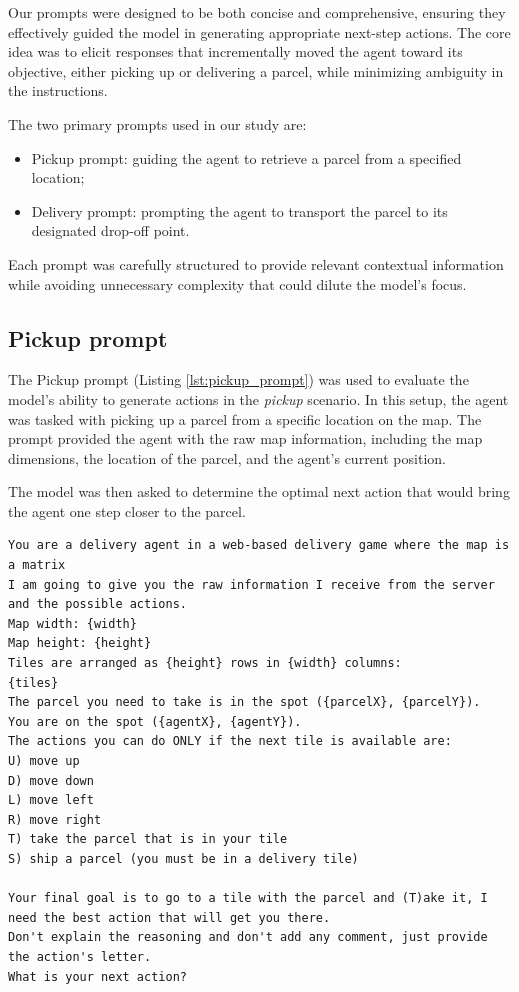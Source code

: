 Our prompts were designed to be both concise and comprehensive, ensuring they effectively
guided the model in generating appropriate next-step actions. The core idea was
to elicit responses that incrementally moved the agent toward its objective, either
picking up or delivering a parcel, while minimizing ambiguity in the
instructions.

The two primary prompts used in our study are:
\begin{itemize}
  \item Pickup prompt: guiding the agent to retrieve a parcel from a specified
    location;

  \item Delivery prompt: prompting the agent to transport the parcel to its
    designated drop-off point.
\end{itemize}

Each prompt was carefully structured to provide relevant contextual information
while avoiding unnecessary complexity that could dilute the model's focus.

\subsection{Pickup prompt}

The Pickup prompt (Listing \ref{lst:pickup_prompt}) was used to evaluate the model's
ability to generate actions in the \emph{pickup} scenario. In this setup, the
agent was tasked with picking up a parcel from a specific location on the map. The
prompt provided the agent with the raw map information, including the map
dimensions, the location of the parcel, and the agent's current position.

The model was then asked to determine the optimal next action that would bring
the agent one step closer to the parcel.

\begin{codewindow}
  [Text]  \begin{lstlisting}
You are a delivery agent in a web-based delivery game where the map is a matrix
I am going to give you the raw information I receive from the server and the possible actions.
Map width: {width}
Map height: {height}
Tiles are arranged as {height} rows in {width} columns:
{tiles}
The parcel you need to take is in the spot ({parcelX}, {parcelY}).
You are on the spot ({agentX}, {agentY}).
The actions you can do ONLY if the next tile is available are:
U) move up
D) move down
L) move left
R) move right
T) take the parcel that is in your tile
S) ship a parcel (you must be in a delivery tile)

Your final goal is to go to a tile with the parcel and (T)ake it, I need the best action that will get you there.
Don't explain the reasoning and don't add any comment, just provide the action's letter.
What is your next action?
\end{lstlisting}
\end{codewindow}

